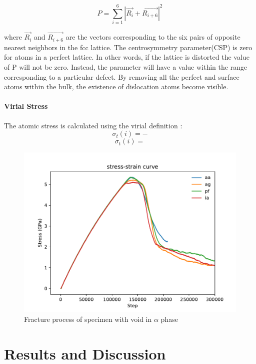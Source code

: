 \documentclass[preview,times]{elsarticle}
\begin{document}
\begin{equation} \label{eq:csp} 
	P = \displaystyle\sum_{i=1}^{6}|\vec{R_i}+\vec{R_{i+6}}|^2
\end{equation}

where $\vec{R_i}$ and $\vec{R_{i+6}}$ are the vectors corresponding to the six pairs of opposite nearest neighbors in the fcc lattice. The centrosymmetry parameter(CSP) is zero for atoms in a perfect lattice. In other words, if the lattice is distorted the value of P will not be zero. Instead, the parameter will have a value within the range corresponding to a particular defect. By removing all the perfect and surface atoms within the bulk, the existence of dislocation atoms become visible.
	
\paragraph{Virial Stress}
The atomic stress is calculated using the virial definition :
$$\sigma_t(i)=-$$
$$\sigma_t(i)= $$
 


\begin{figure}
	\centering
	\includegraphics[width=1\linewidth]{img/allline}
	\caption{Fracture process of specimen with void in $\alpha$ phase}
	\label{fig:all_line}
\end{figure}

\section{Results and Discussion}
\end{document}
